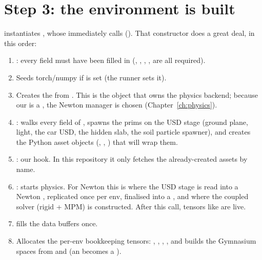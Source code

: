 \section{Step 3: the environment is built}
\label{sec:step_env}

 instantiates
, whose  immediately calls
 ().
That constructor does a great deal, in this order:

\begin{enumerate}[leftmargin=1.8em]
  \item {}: every  field must have been
        filled in (, , ,
        ,  are all required).
  \item Seeds torch/numpy if  is set (the runner sets it).
  \item Creates the  from . This is the
        object that owns the physics backend; because our
         is a , the Newton manager is
        chosen (Chapter~\ref{ch:physics}).
  \item {}: walks every
        field of , spawns the prims on the USD stage
        (ground plane, light, the car USD, the hidden slab, the soil particle
        spawner), and creates the Python asset objects (,
        , ) that will wrap them.
  \item {}: our hook. In this repository it only
        fetches the already-created assets by name.
  \item {}: starts physics. For Newton this is where the
        USD stage is read into a Newton , replicated once
        per env, finalised into a , and where the coupled solver
        (rigid + MPM) is constructed. After this call, tensors like
         are live.
  \item {} fills the data buffers once.
  \item Allocates the per-env bookkeeping tensors:
        , ,
        , , and builds the Gymnasium
        spaces from  and 
        (an  becomes a ).
\end{enumerate}

